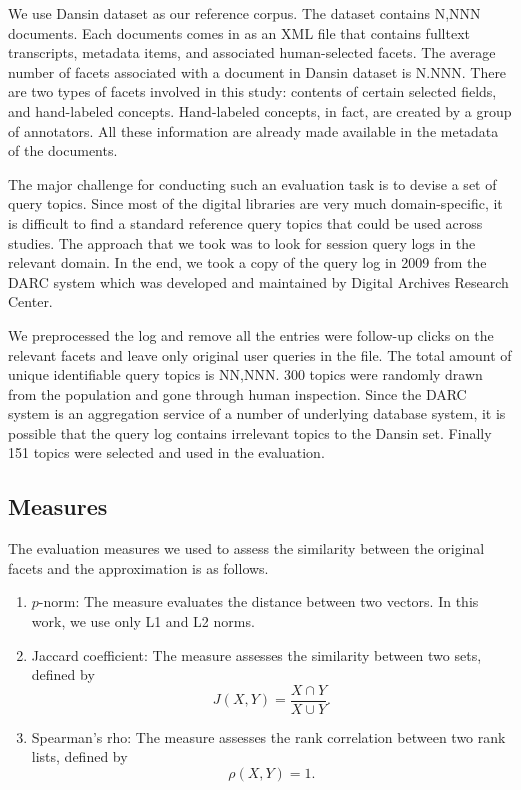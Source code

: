 We use Dansin dataset as our reference corpus.  The dataset contains N,NNN
documents.  Each documents comes in as an XML file that contains fulltext
transcripts, metadata items, and associated human-selected facets.  The average
number of facets associated with a document in Dansin dataset is N.NNN.  There
are two types of facets involved in this study: contents of certain selected
fields, and hand-labeled concepts.  Hand-labeled concepts, in fact, are created
by a group of annotators.  All these information are already made available in
the metadata of the documents.

The major challenge for conducting such an evaluation task is to devise a set
of query topics.  Since most of the digital libraries are very much
domain-specific, it is difficult to find a standard reference query topics that
could be used across studies.  The approach that we took was to look for
session query logs in the relevant domain.  In the end, we took a copy of the
query log in 2009 from the DARC system which was developed and maintained by
Digital Archives Research Center.  

We preprocessed the log and remove all the entries were follow-up clicks on the
relevant facets and leave only original user queries in the file.  The total
amount of unique identifiable query topics is NN,NNN.  300 topics were randomly
drawn from the population and gone through human inspection.  Since the DARC
system is an aggregation service of a number of underlying database system, it
is possible that the query log contains irrelevant topics to the Dansin set.
Finally 151 topics were selected and used in the evaluation.


\subsection{Measures}

The evaluation measures we used to assess the similarity between the original
facets and the approximation is as follows.

\begin{enumerate}
\item $p$-norm: The measure evaluates the distance between two vectors.  In this work, we use only L1 and L2 norms.
\item Jaccard coefficient: The measure assesses the similarity between two sets, defined by
\[ J(X,Y) = \frac{X \cap Y}{X \cup Y}. \]
\item Spearman's rho: The measure assesses the rank correlation between two rank lists, defined by
\[ \rho(X,Y) = 1. \]
\end{enumerate}

